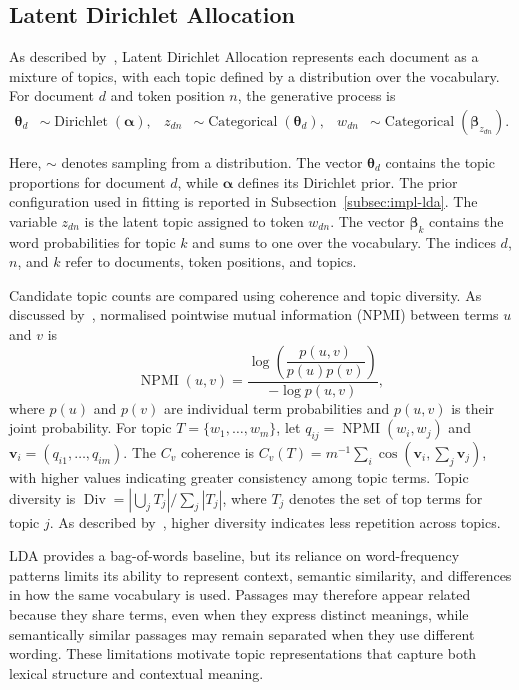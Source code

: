 \subsection{Latent Dirichlet Allocation}
\label{subsec:method-lda}

As described by~\cite{blei2003latent}, Latent Dirichlet Allocation represents each
document as a mixture of topics, with each topic defined by a distribution over the
vocabulary. For document $d$ and token position $n$, the generative process is
\begin{align}
\boldsymbol{\theta}_d
&\sim \operatorname{Dirichlet}(\boldsymbol{\alpha}),
&
z_{dn}
&\sim \operatorname{Categorical}(\boldsymbol{\theta}_d),
&
w_{dn}
&\sim \operatorname{Categorical}(\boldsymbol{\beta}_{z_{dn}}).
\label{eq:method-lda-generative}
\end{align}

Here, $\sim$ denotes sampling from a distribution. The vector $\boldsymbol{\theta}_d$
contains the topic proportions for document $d$, while $\boldsymbol{\alpha}$ defines
its Dirichlet prior. The prior configuration used in fitting is reported in
Subsection~\ref{subsec:impl-lda}. The variable $z_{dn}$ is the latent topic assigned
to token $w_{dn}$. The vector $\boldsymbol{\beta}_k$ contains the word probabilities
for topic $k$ and sums to one over the vocabulary. The indices $d$, $n$, and $k$
refer to documents, token positions, and topics.

Candidate topic counts are compared using coherence and topic diversity. As discussed
by~\cite{newman2010automatic,roder2015exploring}, normalised pointwise mutual
information (NPMI) between terms $u$ and $v$ is
\begin{equation}
\operatorname{NPMI}(u,v)
=
\frac
{\log\!\left(\dfrac{p(u,v)}{p(u)p(v)}\right)}
{-\log p(u,v)},
\label{eq:method-npmi}
\end{equation}
where $p(u)$ and $p(v)$ are individual term probabilities and $p(u,v)$ is their joint
probability. For topic $T{=}\{w_1,\ldots,w_m\}$, let
$q_{ij}{=}\operatorname{NPMI}(w_i,w_j)$ and $\mathbf{v}_i{=}(q_{i1},\ldots,q_{im})$.
The $C_v$ coherence is $C_v(T){=}m^{-1}\sum_i\cos(\mathbf{v}_i,\sum_j\mathbf{v}_j)$,
with higher values indicating greater consistency among topic terms. Topic diversity
is $\operatorname{Div}{=}|\bigcup_j T_j|/\sum_j|T_j|$, where $T_j$ denotes the set of
top terms for topic $j$. As described by~\cite{dieng2020topic}, higher diversity
indicates less repetition across topics.

LDA provides a bag-of-words baseline, but its reliance on word-frequency patterns
limits its ability to represent context, semantic similarity, and differences in how
the same vocabulary is used. Passages may therefore appear related because they share
terms, even when they express distinct meanings, while semantically similar passages
may remain separated when they use different wording. These limitations motivate
topic representations that capture both lexical structure and contextual meaning.

